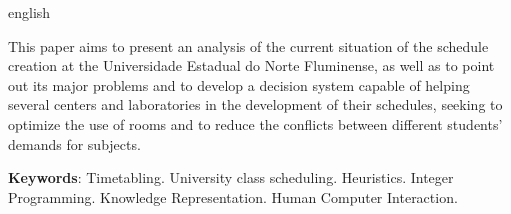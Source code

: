 \begin{resumo}[Abstract]
  \begin{otherlanguage*}{english}

    This paper aims to present an analysis of the current situation of the schedule creation at the Universidade Estadual do Norte Fluminense, as well as to point out its major problems and to develop a decision system capable of helping several centers and laboratories in the development of their schedules, seeking to optimize the use of rooms and to reduce the conflicts between different students' demands for subjects.

    \textbf{Keywords}: Timetabling. University class scheduling. Heuristics. Integer Programming. Knowledge Representation. Human Computer Interaction.

  \end{otherlanguage*}


\end{resumo}